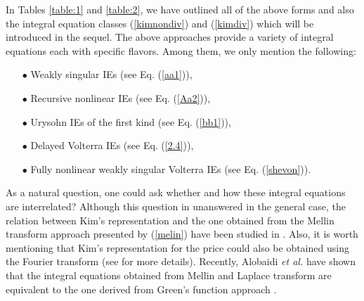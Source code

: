 \documentclass[fleqn,final,3p,11pt]{elsarticle}
\theoremstyle{definition}
\theoremstyle{remark}
\numberwithin{equation}{section}
\begin{document}
In Tables \ref{table:1} and \ref{table:2}, we have outlined all of the above forms and also the integral equation classes (\ref{kimnondiv}) and (\ref{kimdiv}) which will be introduced in the sequel. The above approaches provide a variety of integral equations each with specific flavors. Among them, we only mention the following:
\begin{itemize}
\item[$\bullet$] Weakly singular IEs (see Eq. (\ref{aa1})),
\item[$\bullet$] Recursive nonlinear IEs (see Eq. (\ref{Aa2})),
\item[$\bullet$] Urysohn IEs of the first kind (see Eq. (\ref{bb1})),
\item[$\bullet$] Delayed Volterra IEs (see Eq. (\ref{2.4})),
\item[$\bullet$] Fully nonlinear weakly singular Volterra IEs (see Eq. (\ref{shevon})).
\end{itemize}
As a natural question, one could ask whether and how these integral equations are interrelated? Although this question in unanswered in the general case, the relation between Kim's representation and the one obtained from the Mellin transform approach presented by (\ref{melin}) have been studied in \cite{patrik2}.  Also, it is worth mentioning that Kim's representation for the price could also be obtained using the Fourier transform (see \cite{underwood2002integral} for more details).
Recently, Alobaidi \textit{et al.} have shown that the integral equations obtained from Mellin and Laplace transform are equivalent to the one derived from Green's function approach \cite{alobaidi2014integral}.
\end{document}
